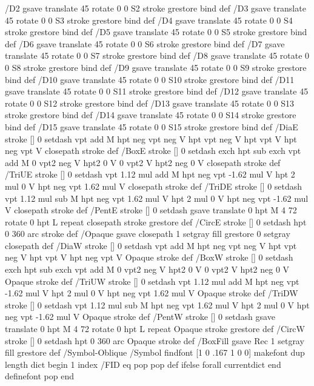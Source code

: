 {{/D2 { gsave translate 45 rotate 0 0 S2 stroke grestore } bind def
/D3 { gsave translate 45 rotate 0 0 S3 stroke grestore } bind def
/D4 { gsave translate 45 rotate 0 0 S4 stroke grestore } bind def
/D5 { gsave translate 45 rotate 0 0 S5 stroke grestore } bind def
/D6 { gsave translate 45 rotate 0 0 S6 stroke grestore } bind def
/D7 { gsave translate 45 rotate 0 0 S7 stroke grestore } bind def
/D8 { gsave translate 45 rotate 0 0 S8 stroke grestore } bind def
/D9 { gsave translate 45 rotate 0 0 S9 stroke grestore } bind def
/D10 { gsave translate 45 rotate 0 0 S10 stroke grestore } bind def
/D11 { gsave translate 45 rotate 0 0 S11 stroke grestore } bind def
/D12 { gsave translate 45 rotate 0 0 S12 stroke grestore } bind def
/D13 { gsave translate 45 rotate 0 0 S13 stroke grestore } bind def
/D14 { gsave translate 45 rotate 0 0 S14 stroke grestore } bind def
/D15 { gsave translate 45 rotate 0 0 S15 stroke grestore } bind def
/DiaE { stroke [] 0 setdash vpt add M
  hpt neg vpt neg V hpt vpt neg V
  hpt vpt V hpt neg vpt V closepath stroke } def
/BoxE { stroke [] 0 setdash exch hpt sub exch vpt add M
  0 vpt2 neg V hpt2 0 V 0 vpt2 V
  hpt2 neg 0 V closepath stroke } def
/TriUE { stroke [] 0 setdash vpt 1.12 mul add M
  hpt neg vpt -1.62 mul V
  hpt 2 mul 0 V
  hpt neg vpt 1.62 mul V closepath stroke } def
/TriDE { stroke [] 0 setdash vpt 1.12 mul sub M
  hpt neg vpt 1.62 mul V
  hpt 2 mul 0 V
  hpt neg vpt -1.62 mul V closepath stroke } def
/PentE { stroke [] 0 setdash gsave
  translate 0 hpt M 4 {72 rotate 0 hpt L} repeat
  closepath stroke grestore } def
/CircE { stroke [] 0 setdash 
  hpt 0 360 arc stroke } def
/Opaque { gsave closepath 1 setgray fill grestore 0 setgray closepath } def
/DiaW { stroke [] 0 setdash vpt add M
  hpt neg vpt neg V hpt vpt neg V
  hpt vpt V hpt neg vpt V Opaque stroke } def
/BoxW { stroke [] 0 setdash exch hpt sub exch vpt add M
  0 vpt2 neg V hpt2 0 V 0 vpt2 V
  hpt2 neg 0 V Opaque stroke } def
/TriUW { stroke [] 0 setdash vpt 1.12 mul add M
  hpt neg vpt -1.62 mul V
  hpt 2 mul 0 V
  hpt neg vpt 1.62 mul V Opaque stroke } def
/TriDW { stroke [] 0 setdash vpt 1.12 mul sub M
  hpt neg vpt 1.62 mul V
  hpt 2 mul 0 V
  hpt neg vpt -1.62 mul V Opaque stroke } def
/PentW { stroke [] 0 setdash gsave
  translate 0 hpt M 4 {72 rotate 0 hpt L} repeat
  Opaque stroke grestore } def
/CircW { stroke [] 0 setdash 
  hpt 0 360 arc Opaque stroke } def
/BoxFill { gsave Rec 1 setgray fill grestore } def
/Symbol-Oblique /Symbol findfont [1 0 .167 1 0 0] makefont
dup length dict begin {1 index /FID eq {pop pop} {def} ifelse} forall
currentdict end definefont pop
end
}}%
